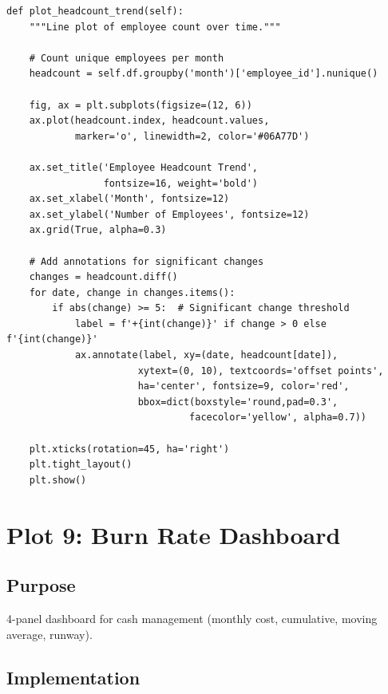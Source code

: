 \begin{lstlisting}[style=pythonstyle]
def plot_headcount_trend(self):
    """Line plot of employee count over time."""
    
    # Count unique employees per month
    headcount = self.df.groupby('month')['employee_id'].nunique()
    
    fig, ax = plt.subplots(figsize=(12, 6))
    ax.plot(headcount.index, headcount.values,
            marker='o', linewidth=2, color='#06A77D')
    
    ax.set_title('Employee Headcount Trend',
                 fontsize=16, weight='bold')
    ax.set_xlabel('Month', fontsize=12)
    ax.set_ylabel('Number of Employees', fontsize=12)
    ax.grid(True, alpha=0.3)
    
    # Add annotations for significant changes
    changes = headcount.diff()
    for date, change in changes.items():
        if abs(change) >= 5:  # Significant change threshold
            label = f'+{int(change)}' if change > 0 else f'{int(change)}'
            ax.annotate(label, xy=(date, headcount[date]),
                       xytext=(0, 10), textcoords='offset points',
                       ha='center', fontsize=9, color='red',
                       bbox=dict(boxstyle='round,pad=0.3',
                                facecolor='yellow', alpha=0.7))
    
    plt.xticks(rotation=45, ha='right')
    plt.tight_layout()
    plt.show()
\end{lstlisting}

\section{Plot 9: Burn Rate Dashboard}

\subsection{Purpose}
4-panel dashboard for cash management (monthly cost, cumulative, moving average, runway).

\subsection{Implementation}

